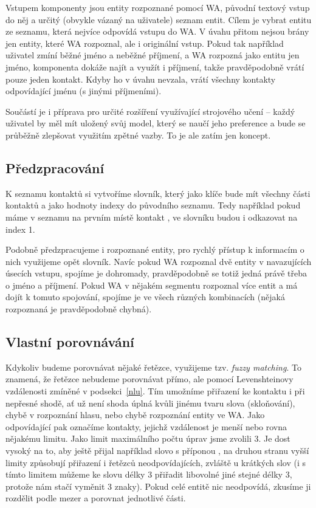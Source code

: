 Vstupem komponenty jsou entity rozpoznané pomocí WA, původní textový vstup do něj
a určitý (obvykle vázaný na uživatele) seznam entit. Cílem je vybrat entitu ze seznamu,
která nejvíce odpovídá vstupu do WA. V úvahu přitom nejsou brány jen entity, které
WA rozpoznal, ale i originální vstup. Pokud tak například uživatel zmíní běžné jméno a
neběžné příjmení, a WA rozpozná jako entitu jen jméno, komponenta dokáže najít a využít
i příjmení, takže pravděpodobně vrátí pouze jeden kontakt. Kdyby ho v úvahu nevzala,
vrátí všechny kontakty odpovídající jménu (s jinými příjmeními).

Součástí je i příprava pro určité rozšíření využívající strojového učení -- každý
uživatel by měl mít uložený svůj model, který se naučí jeho preference a bude se
průběžně zlepšovat využitím zpětné vazby. To je ale zatím jen koncept.

\subsection{Předzpracování}

K seznamu kontaktů si vytvoříme slovník,
který jako klíče bude mít všechny části kontaktů a jako hodnoty indexy do původního
seznamu. Tedy například pokud máme v seznamu na prvním místě kontakt ,
ve slovníku budou  i  odkazovat na index 1.

Podobně předzpracujeme i rozpoznané entity, pro rychlý přístup k informacím o nich
využijeme opět slovník. Navíc pokud WA rozpoznal dvě entity v navazujících úsecích vstupu,
spojíme je dohromady, pravděpodobně se totiž jedná právě třeba o jméno a příjmení.
Pokud WA v nějakém segmentu rozpoznal více entit a má dojít k tomuto spojování, spojíme
je ve všech různých kombinacích (nějaká rozpoznaná je pravděpodobně chybná).

\subsection{Vlastní porovnávání}

Kdykoliv budeme porovnávat nějaké řetězce, využijeme tzv. \textit{fuzzy matching}.
To znamená, že řetězce nebudeme porovnávat přímo, ale pomocí Levenshteinovy vzdálenosti
zmíněné v podsekci~\ref{nlu}. Tím umožníme přiřazení ke kontaktu i při nepřesné shodě,
ať už není shoda úplná kvůli jinému tvaru slova (skloňování), chybě v rozpoznání
hlasu, nebo chybě rozpoznání entity ve WA. Jako odpovídající pak označíme kontakty,
jejichž vzdálenost je menší nebo rovna nějakému limitu. Jako limit maximálního počtu
úprav jsme zvolili 3. Je dost vysoký na to, aby ještě přijal například slovo s příponou
, na druhou stranu vyšší limity způsobují přiřazení i řetězců neodpovídajících,
zvláště u krátkých slov (i s tímto limitem můžeme ke slovu délky 3 přiřadit libovolné jiné
stejné délky 3, protože nám stačí vyměnit 3 znaky). Pokud celé entitě nic neodpovídá,
zkusíme ji rozdělit podle mezer a porovnat jednotlivé části.

